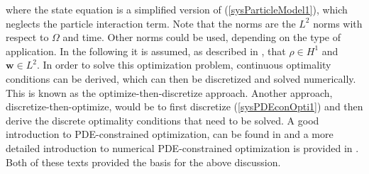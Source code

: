 where the state equation is a simplified version of (\ref{sysParticleModel1}), which neglects the particle interaction term.
Note that the norms are the $L^2$ norms with respect to $\Omega$ and time. Other norms could be used, depending on the type of application. In the following it is assumed, as described in \cite{TroeltzschFredi2010OCoP}, that $\rho \in H^1$ and $\mathbf{w} \in L^2$.
In order to solve this optimization problem, continuous optimality conditions can be derived, which can then be discretized and solved numerically. This is known as the optimize-then-discretize approach.
Another approach, discretize-then-optimize, would be to first discretize (\ref{sysPDEconOpti1}) and then derive the discrete optimality conditions that need to be solved.
A good introduction to PDE-constrained optimization, can be found in \cite{PearsonThesis} and a more detailed introduction to numerical PDE-constrained optimization is provided in \cite{DeLosReyesOptimization}. Both of these texts provided the basis for the above discussion.